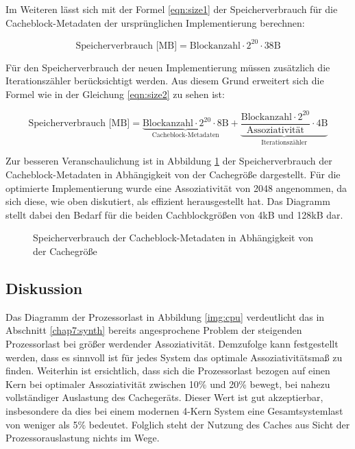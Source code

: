 Im Weiteren lässt sich mit der Formel \ref{eqn:size1} der Speicherverbrauch für die Cacheblock-Metadaten der ursprünglichen Implementierung berechnen:

\begin{equation}\label{eqn:size1}
\text{Speicherverbrauch [MB]} = \text{Blockanzahl} \cdot 2^{20} \cdot 38 \text{B}
\end{equation}

\clearpage

Für den Speicherverbrauch der neuen Implementierung müssen zusätzlich die Iterationszähler berücksichtigt werden. Aus diesem Grund erweitert sich die Formel wie
in der Gleichung \ref{eqn:size2} zu sehen ist:

\begin{equation}\label{eqn:size2}
\text{Speicherverbrauch [MB]} = \underbrace{\text{Blockanzahl} \cdot 2^{20} \cdot 8 \text{B}}_{\text{Cacheblock-Metadaten}} + \underbrace{\frac{\displaystyle \text{Blockanzahl} \cdot 2^{20}}{\displaystyle \text{Assoziativität}} \cdot 4 \text{B}}_{\text{Iterationszähler}}
\end{equation}

Zur besseren Veranschaulichung ist in Abbildung \ref{img:memory} der Speicherverbrauch der Cache\-block-Metadaten in Abhängigkeit von der Cachegröße dargestellt.
Für die optimierte Implementierung wurde eine Assoziativität von 2048 angenommen, da sich diese, wie oben diskutiert, als effizient herausgestellt hat. Das Diagramm
stellt dabei den Bedarf für die beiden Cachblockgrößen von 4kB und 128kB dar.

\begin{figure}[t!]\centering
  \caption[Speicherverbrauch der Cacheblock-Metadaten]{Speicherverbrauch der Cacheblock-Metadaten in Abhängigkeit von der Cachegröße}
  \label{img:memory}
\end{figure}

\subsection{Diskussion}

Das Diagramm der Prozessorlast in Abbildung \ref{img:cpu} verdeutlicht das in Abschnitt \ref{chap7:synth} bereits angesprochene Problem der steigenden
Prozessorlast bei größer werdender Assoziativität. Demzufolge kann festgestellt werden, dass es sinnvoll ist für jedes System das optimale Assoziativitätsmaß zu
finden. Weiterhin ist ersichtlich, dass sich die Prozessorlast bezogen auf einen Kern bei optimaler Assoziativität  zwischen 10\% und 20\% bewegt, bei nahezu
vollständiger Auslastung des Cachegeräts. Dieser Wert ist gut akzeptierbar, insbesondere da dies bei einem modernen 4-Kern System eine Gesamtsystemlast
von weniger als 5\% bedeutet. Folglich steht der Nutzung des Caches aus Sicht der Prozessorauslastung nichts im Wege.

